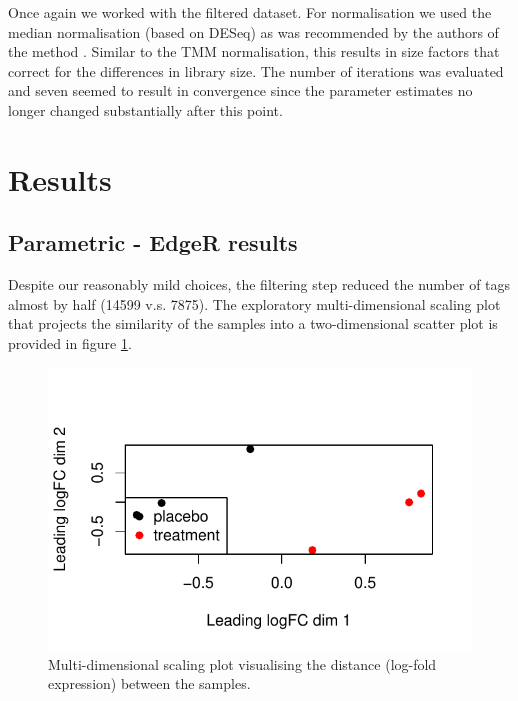 \documentclass[a4paper,10pt]{article}\usepackage[]{graphicx}\usepackage[]{color}
\makeatletter
\def\maxwidth{ %
  \ifdim\Gin@nat@width>\linewidth
    \linewidth
  \else
    \Gin@nat@width
  \fi
}
\newenvironment{knitrout}{}{} %
\makeatother
\begin{document}
Once again we worked with the filtered dataset. For normalisation we used the median normalisation (based on DESeq) as was recommended by the authors of the method \autocite{leng_ebseq_2015}. Similar to the TMM normalisation, this results in size factors that correct for the differences in library size. The number of iterations was evaluated and seven seemed to result in convergence since the parameter estimates no longer changed substantially after this point.

\section{Results}
\subsection{Parametric - EdgeR results}




Despite our reasonably mild choices, the filtering step reduced the number of tags almost by half (14599 v.s. 7875). The exploratory multi-dimensional scaling plot that projects the similarity of the samples into a two-dimensional scatter plot is provided in figure \ref{edgeR-mds}.

\begin{figure}[H]
  \centering
\begin{knitrout}
\color{fgcolor}

{\centering \includegraphics[width=\maxwidth]{figures/plots-edgeR-exploration-1} 

}



\end{knitrout}
\caption{Multi-dimensional scaling plot visualising the distance (log-fold expression) between the samples.}
\label{edgeR-mds}
\end{figure}
\end{document}
